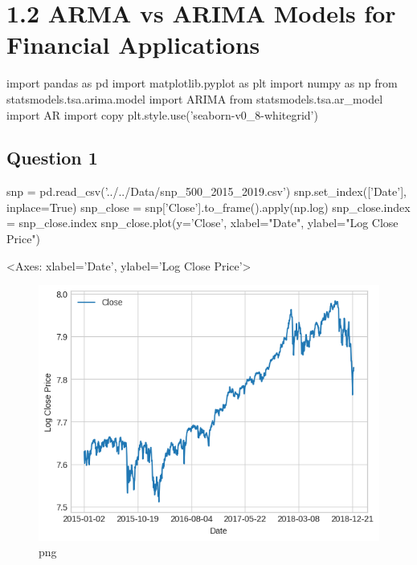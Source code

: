 \hypertarget{arma-vs-arima-models-for-financial-applications}{%
\section{1.2 ARMA vs ARIMA Models for Financial
Applications}\label{arma-vs-arima-models-for-financial-applications}}

\begin{python}[language=Python]
import pandas as pd
import matplotlib.pyplot as plt
import numpy as np
from statsmodels.tsa.arima.model import ARIMA
from statsmodels.tsa.ar_model import AR
import copy
plt.style.use('seaborn-v0_8-whitegrid')
\end{python}

\hypertarget{question-1}{%
\subsection{Question 1}\label{question-1}}

\begin{python}[language=Python]
snp = pd.read_csv('../../Data/snp_500_2015_2019.csv')
snp.set_index(['Date'], inplace=True)
snp_close = snp['Close'].to_frame().apply(np.log)
snp_close.index = snp_close.index
snp_close.plot(y='Close', xlabel="Date", ylabel="Log Close Price")
\end{python}

\begin{python}
<Axes: xlabel='Date', ylabel='Log Close Price'>
\end{python}

\begin{figure}[h]
\centering
\includegraphics[scale=0.75]{ARMAvsARIMA_files/ARMAvsARIMA_3_1.png}
\caption{png}
\end{figure}

